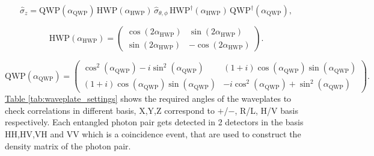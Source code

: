 \begin{equation}
\hat{\sigma}_z = \text{QWP}(\alpha_{\text{QWP}}) \, \text{HWP}(\alpha_{\text{HWP}}) \, \hat{\sigma}_{\theta,\phi} \, \text{HWP}^\dagger(\alpha_{\text{HWP}}) \, \text{QWP}^\dagger(\alpha_{\text{QWP}}),
\label{eq:2.5}
\end{equation}

\begin{equation}
\text{HWP}(\alpha_{\text{HWP}}) =
\begin{pmatrix}
\cos(2\alpha_{\text{HWP}}) & \sin(2\alpha_{\text{HWP}}) \\
\sin(2\alpha_{\text{HWP}}) & -\cos(2\alpha_{\text{HWP}})
\end{pmatrix}.
\end{equation}

\begin{equation}
\text{QWP}(\alpha_{\text{QWP}}) =
\begin{pmatrix}
\cos^2(\alpha_{\text{QWP}}) - i\sin^2(\alpha_{\text{QWP}}) & (1 + i)\cos(\alpha_{\text{QWP}})\sin(\alpha_{\text{QWP}}) \\
(1 + i)\cos(\alpha_{\text{QWP}})\sin(\alpha_{\text{QWP}}) & -i\cos^2(\alpha_{\text{QWP}}) + \sin^2(\alpha_{\text{QWP}})
\end{pmatrix}.
\end{equation}
\hyperref[tab:waveplate_settings]{Table \ref*{tab:waveplate_settings}} shows the required angles of the waveplates to check correlations in different basis, X,Y,Z correspond to $+$/$-$, R/L, H/V basis respectively. Each entangled photon pair gets detected in 2 detectors in the basis HH,HV,VH and VV which is a coincidence event, that are used to construct the density matrix of the photon pair.



